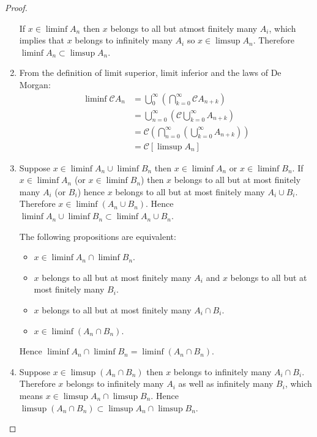 \begin{proof}
\begin{enumerate}[label={(\alph*)}, leftmargin=*]
		      If \( x \in \liminf A_{n} \) then \( x \) belongs to all but atmost finitely many \( A_{i} \), which implies that \( x \) belongs to infinitely many \( A_{i} \) so \( x \in \limsup A_{n} \). Therefore \( \liminf A_{n} \subset \limsup A_{n} \).
		\item From the definition of limit superior, limit inferior and the laws of De Morgan:
		      \begingroup
		      \allowdisplaybreaks%
		      \begin{align*}
			      \liminf \mathscr{C}A_{n} & = \bigcup^{\infty}_{0}\left(\bigcap^{\infty}_{k=0} \mathscr{C}A_{n+k}\right)                \\
			                               & = \bigcup^{\infty}_{n=0}\left(\mathscr{C}\bigcup^{\infty}_{k=0}A_{n+k}\right)               \\
			                               & = \mathscr{C}\left(\bigcap^{\infty}_{n=0}\left(\bigcup^{\infty}_{k=0} A_{n+k}\right)\right) \\
			                               & = \mathscr{C}[\limsup A_{n}]
		      \end{align*}
		      \endgroup
		\item Suppose \( x \in \liminf A_{n} \cup \liminf B_{n} \) then \( x \in \liminf A_{n} \) or \( x \in \liminf B_{n} \). If \( x \in \liminf A_{n} \) (or \( x \in \liminf B_{n} \)) then \( x \) belongs to all but at most finitely many \( A_{i} \) (or \( B_{i} \)) hence \( x \) belongs to all but at most finitely many \( A_{i} \cup B_{i} \). Therefore \( x \in \liminf (A_{n} \cup B_{n}) \). Hence \( \liminf A_{n} \cup \liminf B_{n} \subset \liminf A_{n} \cup B_{n} \).

		      The following propositions are equivalent:
		      \begin{itemize}[leftmargin=*]
			      \item \( x \in \liminf A_{n} \cap \liminf B_{n} \).
			      \item \( x \) belongs to all but at most finitely many \( A_{i} \) and \( x \) belongs to all but at most finitely many \( B_{i} \).
			      \item \( x \) belongs to all but at most finitely many \( A_{i} \cap B_{i} \).
			      \item \( x \in \liminf (A_{n} \cap B_{n}) \).
		      \end{itemize}

		      Hence \( \liminf A_{n} \cap \liminf B_{n} = \liminf (A_{n} \cap B_{n}) \).
		\item Suppose \( x \in \limsup (A_{n} \cap B_{n}) \) then \( x \) belongs to infinitely many \( A_{i} \cap B_{i} \). Therefore \( x \) belongs to infinitely many \( A_{i} \) as well as infinitely many \( B_{i} \), which means \( x \in \limsup A_{n} \cap \limsup B_{n} \). Hence \( \limsup (A_{n} \cap B_{n}) \subset \limsup A_{n} \cap \limsup B_{n} \).


\end{enumerate}
\end{proof}
